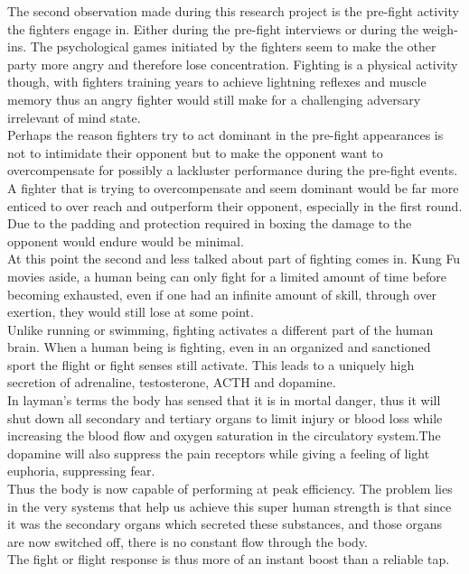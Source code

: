\documentclass{article}
\begin{document}
The second observation made during this research project is the pre-fight activity the fighters engage in. Either during the pre-fight interviews or during the weigh-ins. The psychological games initiated by the fighters seem to make the other party more angry and therefore lose concentration. Fighting is a physical activity though, with fighters training years to achieve lightning reflexes and muscle memory thus an angry fighter would still make for a challenging adversary irrelevant of mind state. \\
Perhaps the reason fighters try to act dominant in the pre-fight appearances is not to intimidate their opponent but to make the opponent want to overcompensate for possibly a lackluster performance during the pre-fight events.\cite{2}\\
A fighter that is trying to overcompensate and seem dominant would be far more enticed to over reach and outperform their opponent, especially in the first round. Due to the padding and protection required in boxing the damage to the opponent would endure would be minimal.\cite{two} \\
At this point the second and less talked about part of fighting comes in. Kung Fu movies aside, a human being can only fight for a limited amount of time before becoming exhausted, even if one had an infinite amount of skill, through over exertion, they would still lose at some point.\\
Unlike running or swimming, fighting activates a different part of the human  brain. When a human being is fighting, even in an organized and sanctioned sport the flight or fight senses still activate.\cite{three}
This leads to a uniquely high  secretion of adrenaline, testosterone, ACTH and dopamine.\\
In layman's terms the body has sensed that it is in mortal danger, thus it will shut down all secondary and tertiary organs to limit injury or blood loss while increasing the blood flow and oxygen saturation in the circulatory system.The dopamine will also suppress the pain receptors while giving a feeling of light euphoria, suppressing fear.\cite{six}\\
Thus the body is now capable of performing at peak efficiency.\cite{seven} The problem lies in the very systems that help us achieve this super human strength is that since it was the secondary organs which secreted these substances, and those organs are now switched off, there is no constant flow through the body. \\
The fight or flight response is thus more of an instant boost than a reliable tap. \\
\end{document}
